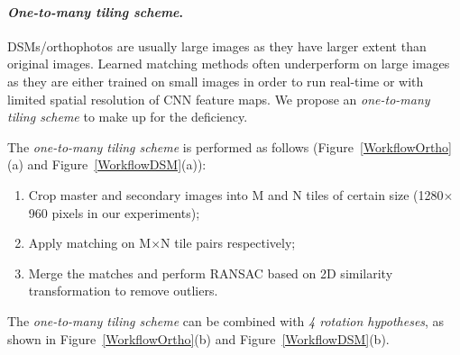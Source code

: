 \paragraph{\textit{One-to-many tiling scheme}.}
DSMs/orthophotos are usually large images as they have larger extent than original images.
Learned matching methods often underperform on large images as they are either trained on small images in order to run real-time or with limited spatial resolution of CNN feature maps. We propose an \textit{one-to-many tiling scheme} to make up for the deficiency. 
\par
The \textit{one-to-many tiling scheme} is performed as follows (Figure~\ref{WorkflowOrtho}(a) and Figure~\ref{WorkflowDSM}(a)):\\
\begin{enumerate}
    \item Crop master and secondary images into M and N tiles of certain size (1280$\times$960 pixels in our experiments);
    \item Apply matching on M$\times$N tile pairs respectively;
    \item Merge the matches and perform RANSAC based on 2D similarity transformation to remove outliers.
\end{enumerate}                                   
\par
The \textit{one-to-many tiling scheme} can be combined with \textit{4 rotation hypotheses}, as shown in Figure~\ref{WorkflowOrtho}(b) and Figure~\ref{WorkflowDSM}(b).
